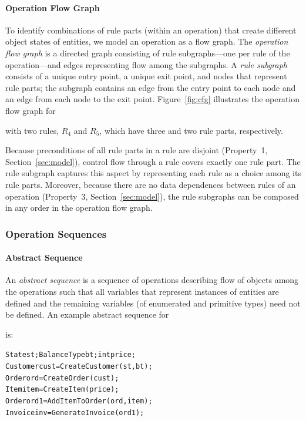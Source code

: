\paragraph*{Operation Flow Graph} To identify combinations of rule parts (within
an operation) that create different object states of entities, we model an
operation as a flow graph. The \textit{operation flow graph} is a directed graph
consisting of rule subgraphs---one per rule of the operation---and edges
representing flow among the subgraphs. A \textit{rule subgraph} consists of a
unique entry point, a unique exit point, and nodes that represent rule parts;
the subgraph contains an edge from the entry point to each node and an edge from
each node to the exit point.  Figure~\ref{fig:cfg} illustrates the operation
flow graph for \subject{GenerateInvoice} with two rules, $R_4$ and $R_5$, which
have three and two rule parts, respectively.

Because preconditions of all rule parts in a rule are disjoint (Property~1,
Section~\ref{sec:model}), control flow through a rule covers exactly one rule
part.  The rule subgraph captures this aspect by representing each rule as a
choice among its rule parts. Moreover, because there are no data dependences
between rules of an operation (Property~3, Section~\ref{sec:model}), the rule
subgraphs can be composed in any order in the operation flow graph.

\subsubsection{Operation Sequences}

\paragraph*{Abstract Sequence} An \textit{abstract sequence} is a sequence of
operations describing flow of objects among the operations such that all
variables that represent instances of entities are defined and the remaining
variables (of enumerated and primitive types) need not be defined. An example
abstract sequence for \subject{GenerateInvoice} is:

\vspace*{-4pt}
{\scriptsize
\begin{alltt} 
 State st; BalanceType bt; int price;
 Customer cust = CreateCustomer(st, bt);
 Order ord = CreateOrder(cust);	 
 Item item = CreateItem(price);
 Order ord1 = AddItemToOrder(ord, item);
 Invoice inv = GenerateInvoice(ord1);  
\end{alltt}
}
\vspace*{-4pt}


